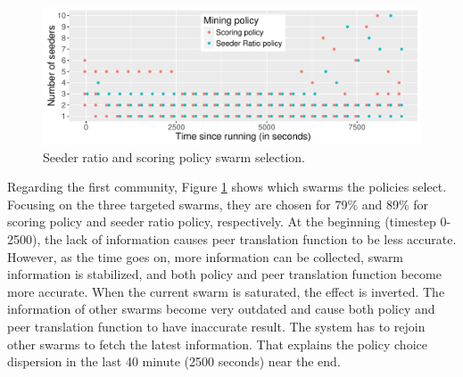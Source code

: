 \label{section:chooseswarmexp}
\begin{figure}[h]
	\centering
	\includegraphics[width=\textwidth]{pics/results/scsr_notrig_scatter.pdf}
	\caption{Seeder ratio and scoring policy swarm selection.}
	\label{fig:scatterscsrnotrig}
\end{figure}

Regarding the first community, Figure \ref{fig:scatterscsrnotrig} shows which swarms the policies select. Focusing on the three targeted swarms, they are chosen for 79\% and 89\% for scoring policy and seeder ratio policy, respectively. At the beginning (timestep 0-2500), the lack of information causes peer translation function to be less accurate. However, as the time goes on, more information can be collected, swarm information is stabilized, and both policy and peer translation function become more accurate. When the current swarm is saturated, the effect is inverted. The information of other swarms become very outdated and cause both policy and peer translation function to have inaccurate result. The system has to rejoin other swarms to fetch the latest information. That explains the policy choice dispersion in the last 40 minute (2500 seconds) near the end. 

